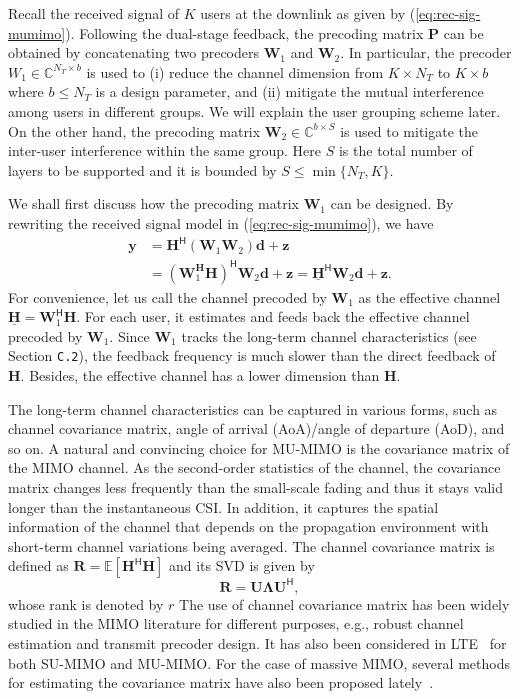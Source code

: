 \documentclass[a4paper,12pt]{article}%
\begin{document}
Recall the received signal of $K$ users at the downlink as given by (\ref{eq:rec-sig-mumimo}). Following the dual-stage feedback, the precoding matrix $\mathbf{P}$ can be obtained by concatenating two precoders $\mathbf{W}_1$ and $\mathbf{W}_2$. In particular, the precoder $W_1 \in \mathbb{C}^{N_T \times b}$ is used to (i) reduce the channel dimension from $K\times N_T$ to $K\times b$ where $b \leq N_T$ is a design parameter, and (ii) mitigate the mutual interference among users in different groups. We will explain the user grouping scheme later. On the other hand, the precoding matrix $\mathbf{W}_2 \in \mathbb{C}^{b\times S}$ is used to mitigate the inter-user interference within the same group. Here $S$ is the total number of layers to be supported and it is bounded by $S \leq \min\{ N_T, K \}$.

We shall first discuss how the precoding matrix $\mathbf{W}_1$ can be designed. By rewriting the received signal model in (\ref{eq:rec-sig-mumimo}), we have
\begin{align}\label{eq:effective-rec-sig-mumimo}
\mathbf{y} &= \mathbf{H}^\mathsf{H}(\mathbf{W}_1 \mathbf{W}_2)\mathbf{d} + \mathbf{z} \nonumber \\
&= (\mathbf{W}_1^\mathbf{H} \mathbf{H})^\mathsf{H} \mathbf{W}_2\mathbf{d} + \mathbf{z} = \underline{\mathbf{H}}^\mathsf{H} \mathbf{W}_2 \mathbf{d} + \mathbf{z}.
\end{align}
For convenience, let us call the channel precoded by $\mathbf{W}_1$ as the effective channel $\underline{\mathbf{H}}=\mathbf{W}_1^\mathsf{H} \mathbf{H}$. For each user, it estimates and feeds back the effective channel precoded by $\mathbf{W}_1$. Since $\mathbf{W}_1$ tracks the long-term channel characteristics (see Section \texttt{C.2}), the feedback frequency is much slower than the direct feedback of $\mathbf{H}$. Besides, the effective channel has a lower dimension than $\mathbf{H}$. 

The long-term channel characteristics can be captured in various forms, such as channel covariance matrix, angle of arrival (AoA)/angle of departure (AoD), and so on. A natural and convincing choice for MU-MIMO is the covariance matrix of the MIMO channel. As the second-order statistics of the channel, the covariance matrix changes less frequently than the small-scale fading and thus it stays valid longer than the instantaneous CSI. In addition, it captures the spatial information of the channel that depends on the propagation environment with short-term channel variations being averaged. The channel covariance matrix is defined as $\mathbf{R}=\mathbb{E}[\mathbf{H}^\mathsf{H}\mathbf{H}]$ and its SVD is given by
\begin{equation}\label{eq:covariance-matrix}
\mathbf{R}= \mathbf{U} \boldsymbol{\Lambda} \mathbf{U}^\mathsf{H},
\end{equation} 
whose rank is denoted by $r$ 
The use of channel covariance matrix has been widely studied in the MIMO literature for different purposes, e.g., robust channel estimation and transmit precoder design. It has also been considered in LTE~\cite{R1-100190,R1-094920} for both SU-MIMO and MU-MIMO. For the case of massive MIMO, several methods for estimating the covariance matrix have also been proposed lately~\cite{Ghosh2012,Neumann}. 
\end{document}
